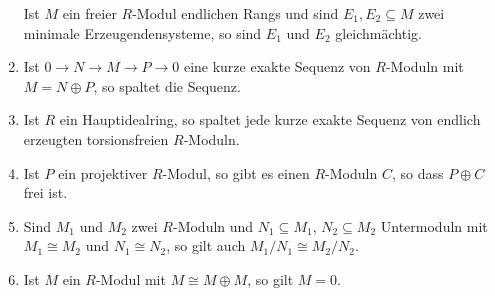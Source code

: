 \begin{question}[subtitle = Wahr oder Falsch?]
\begin{enumerate}
      Ist $M$ ein freier $R$-Modul endlichen Rangs und sind $E_1, E_2 \subseteq M$ zwei minimale Erzeugendensysteme, so sind $E_1$ und $E_2$ gleichmächtig.
    \item
      Ist $0 \to N \to M \to P \to 0$ eine kurze exakte Sequenz von $R$-Moduln mit $M = N \oplus P$, so spaltet die Sequenz.
    \item
      Ist $R$ ein Hauptidealring, so spaltet jede kurze exakte Sequenz von endlich erzeugten torsionsfreien $R$-Moduln.
    \item
      Ist $P$ ein projektiver $R$-Modul, so gibt es einen $R$-Moduln $C$, so dass $P \oplus C$ frei ist.
    \item
      Sind $M_1$ und $M_2$ zwei $R$-Moduln und $N_1 \subseteq M_1$, $N_2 \subseteq M_2$ Untermoduln mit $M_1 \cong M_2$ und $N_1 \cong N_2$, so gilt auch $M_1/N_1 \cong M_2/N_2$.
    \item
      Ist $M$ ein $R$-Modul mit $M \cong M \oplus M$, so gilt $M = 0$.
  \end{enumerate}
\end{question}


